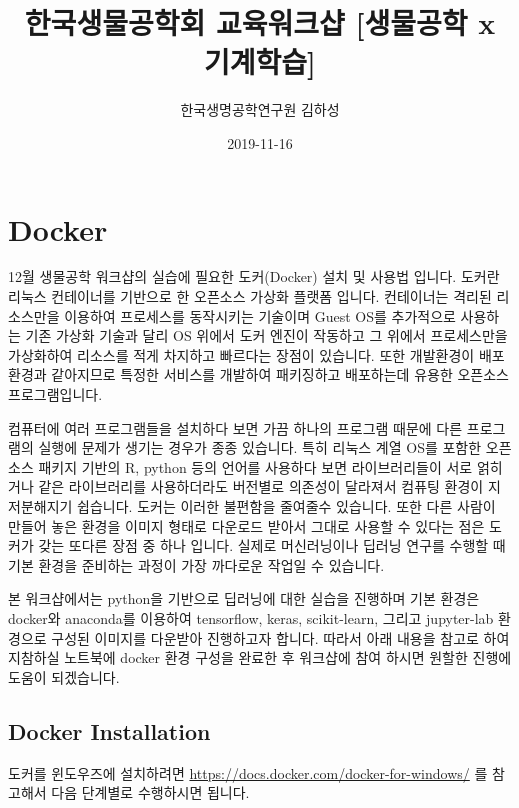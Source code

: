 \documentclass[]{book}
\title{한국생물공학회 교육워크샵 {[}생물공학 x 기계학습{]}}
\author{한국생명공학연구원 김하성}
\date{2019-11-16}
\begin{document}
\maketitle

{
\setcounter{tocdepth}{1}
\tableofcontents
}
\hypertarget{docker}{%
\chapter{Docker}\label{docker}}

12월 생물공학 워크샵의 실습에 필요한 도커(Docker) 설치 및 사용법 입니다. 도커란 리눅스 컨테이너를 기반으로 한 오픈소스 가상화 플랫폼 입니다. 컨테이너는 격리된 리소스만을 이용하여 프로세스를 동작시키는 기술이며 Guest OS를 추가적으로 사용하는 기존 가상화 기술과 달리 OS 위에서 도커 엔진이 작동하고 그 위에서 프로세스만을 가상화하여 리소스를 적게 차지하고 빠르다는 장점이 있습니다. 또한 개발환경이 배포환경과 같아지므로 특정한 서비스를 개발하여 패키징하고 배포하는데 유용한 오픈소스 프로그램입니다.

컴퓨터에 여러 프로그램들을 설치하다 보면 가끔 하나의 프로그램 때문에 다른 프로그램의 실행에 문제가 생기는 경우가 종종 있습니다. 특히 리눅스 계열 OS를 포함한 오픈소스 패키지 기반의 R, python 등의 언어를 사용하다 보면 라이브러리들이 서로 얽히거나 같은 라이브러리를 사용하더라도 버전별로 의존성이 달라져서 컴퓨팅 환경이 지저분해지기 쉽습니다. 도커는 이러한 불편함을 줄여줄수 있습니다. 또한 다른 사람이 만들어 놓은 환경을 이미지 형태로 다운로드 받아서 그대로 사용할 수 있다는 점은 도커가 갖는 또다른 장점 중 하나 입니다. 실제로 머신러닝이나 딥러닝 연구를 수행할 때 기본 환경을 준비하는 과정이 가장 까다로운 작업일 수 있습니다.

본 워크샵에서는 python을 기반으로 딥러닝에 대한 실습을 진행하며 기본 환경은 docker와 anaconda를 이용하여 tensorflow, keras, scikit-learn, 그리고 jupyter-lab 환경으로 구성된 이미지를 다운받아 진행하고자 합니다. 따라서 아래 내용을 참고로 하여 지참하실 노트북에 docker 환경 구성을 완료한 후 워크샵에 참여 하시면 원할한 진행에 도움이 되겠습니다.

\hypertarget{docker-installation}{%
\section{Docker Installation}\label{docker-installation}}

도커를 윈도우즈에 설치하려면 \url{https://docs.docker.com/docker-for-windows/} 를 참고해서 다음 단계별로 수행하시면 됩니다.
\end{document}

